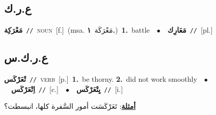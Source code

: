 \documentclass[10pt,a4paper,twoside]{article} %
\begin{document}
\begin{multicols}{2}
\vspace{-3mm}
\subsection*{\color{blue}\foreignlanguage{arabic}{ع.ر.ك}\color{blue}{}} 

{\setlength\topsep{0pt}\textbf{\foreignlanguage{arabic}{مَعْرَكِة}}\ {\color{gray}\texttt{//}\color{black}}\ \textsc{noun}\ [f.]\ \color{gray}(msa. \foreignlanguage{arabic}{مَعْرَكَة}~\foreignlanguage{arabic}{\textbf{١.}})\color{black}\ \textbf{1.}~battle\ \ $\bullet$\ \ \setlength\topsep{0pt}\textbf{\foreignlanguage{arabic}{مَعَارِك}}\ {\color{gray}\texttt{//}\color{black}}\ [pl.]\ } \vspace{2mm}

\vspace{-3mm}
\subsection*{\color{blue}\foreignlanguage{arabic}{ع.ر.ك.س}\color{blue}{}} 

{\setlength\topsep{0pt}\textbf{\foreignlanguage{arabic}{تْعَرْكَس}}\ {\color{gray}\texttt{//}\color{black}}\ \textsc{verb}\ [p.]\ \textbf{1.}~be thorny.  \textbf{2.}~did not work smoothly\ \ $\bullet$\ \ \setlength\topsep{0pt}\textbf{\foreignlanguage{arabic}{اِتْعَرْكَس}}\ {\color{gray}\texttt{//}\color{black}}\ [c.]\ \ $\bullet$\ \ \setlength\topsep{0pt}\textbf{\foreignlanguage{arabic}{يِتْعَرْكَس}}\ {\color{gray}\texttt{//}\color{black}}\ [i.]\  \begin{flushright}\color{gray}\foreignlanguage{arabic}{\textbf{\underline{\foreignlanguage{arabic}{أمثلة}}}: تَعَرْكَسَت أمور السَّفرة كلها، انبسطت؟}\end{flushright}\color{black}} \vspace{2mm}


\end{multicols}
\end{document}
